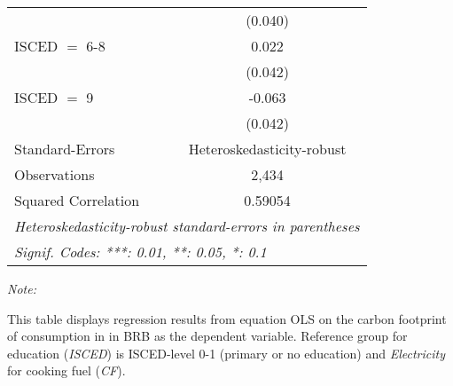 \begin{table}[htbp!]
\begin{adjustbox}{width = 1\textwidth, max height = 0.95\textheight, center}
\begin{threeparttable}[b]
\begin{tabular}{lc}
                                & (0.040)\\   
            ISCED $=$ 6-8       & 0.022\\   
                                & (0.042)\\   
            ISCED $=$ 9         & -0.063\\   
                                & (0.042)\\   
            \midrule 
            Standard-Errors     & Heteroskedasticity-robust \\   
            Observations        & 2,434\\  
            Squared Correlation & 0.59054\\  
            \midrule \midrule
            \multicolumn{2}{l}{\emph{Heteroskedasticity-robust standard-errors in parentheses}}\\
            \multicolumn{2}{l}{\emph{Signif. Codes: ***: 0.01, **: 0.05, *: 0.1}}\\
         \end{tabular}
         
         \begin{tablenotes}\item \medskip \textit{Note:}
            \item This table displays regression results from equation OLS on the carbon footprint of consumption in  in BRB as the dependent variable.  Reference group for education (\textit{ISCED}) is ISCED-level 0-1 (primary or no education) and \textit{Electricity} for cooking fuel (\textit{CF}).
         \end{tablenotes}
      \end{threeparttable}
   \end{adjustbox}
\end{table}


